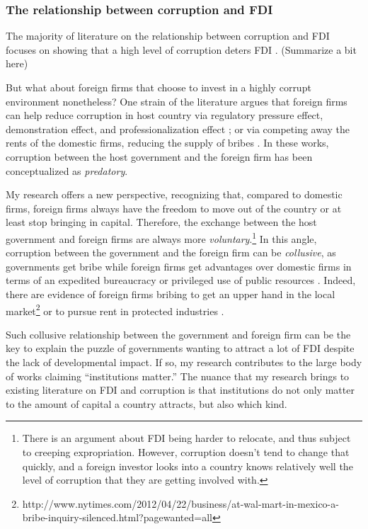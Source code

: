 \subsubsection{The relationship between corruption and FDI}

The majority of literature on the relationship between corruption and FDI focuses on showing that a high level of corruption deters FDI \citep{Wei2000, Hakkala2008, Al-Sadig2009}. (Summarize a bit here) 

But what about foreign firms that choose to invest in a highly corrupt environment nonetheless? One strain of the literature argues that foreign firms can help reduce corruption in host country via regulatory pressure effect, demonstration effect, and professionalization effect \citep{Kwok2006}; or via competing away the rents of the domestic firms, reducing the supply of bribes \citep{Sandholtz2003}. In these works, corruption between the host government and the foreign firm has been conceptualized as \textit{predatory}.

My research offers a new perspective, recognizing that, compared to domestic firms, foreign firms always have the freedom to move out of the country or at least stop bringing in capital. Therefore, the exchange between the host government and foreign firms are always more \textit{voluntary}.\footnote{There is an argument about FDI being harder to relocate, and thus subject to creeping expropriation. However, corruption doesn't tend to change that quickly, and a foreign investor looks into a country knows relatively well the level of corruption that they are getting involved with.} In this angle, corruption between the government and the foreign firm can be \textit{collusive}, as governments get bribe while foreign firms get advantages over domestic firms in terms of an expedited bureaucracy or privileged use of public resources \citep{Hellman2002}. Indeed, there are evidence of foreign firms bribing to get an upper hand in the local market\footnote{http://www.nytimes.com/2012/04/22/business/at-wal-mart-in-mexico-a-bribe-inquiry-silenced.html?pagewanted=all} or to pursue rent in protected industries \citep{Malesky2015}. 

Such collusive relationship between the government and foreign firm can be the key to explain the puzzle of governments wanting to attract a lot of FDI despite the lack of developmental impact. If so, my research contributes to the large body of works claiming ``institutions matter.'' The nuance that my research brings to existing literature on FDI and corruption is that institutions do not only matter to the amount of capital a country attracts, but also which kind.

